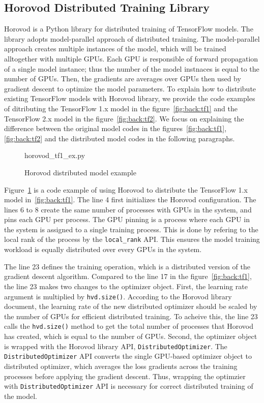 \subsection{Horovod Distributed Training Library}

Horovod is a Python library for distributed training of TensorFlow models.
The library adopts model-parallel approach of distributed training.
The model-parallel approach creates multiple instances of the model,
which will be trained alltogether with multiple GPUs.
Each GPU is responsible of forward propagation of a single model instance;
thus the number of the model instnaces is equal to the number of GPUs.
Then, the gradients are averages over GPUs then used by gradient descent
to optimize the model parameters. 
To explain how to distribute existing TensorFlow models with Horovod library,
we provide the code examples of ditributing 
the TensorFlow 1.x model in the figure~\ref{fig:back:tf1} and the TensorFlow
2.x model in the figure~\ref{fig:back:tf2}.
We focus on explaining the difference between the original model codes in
the figures~\ref{fig:back:tf1}, \ref{fig:back:tf2} and the distributed 
model codes in the following paragraphs.

\begin{figure}[ht!]
 
{horovod_tf1_ex.py}
  \caption{Horovod distributed model example}
\label{fig:back:hvd1} 
\end{figure}

Figure~\ref{fig:back:hvd1} is a code example of using Horovod to distribute
the TensorFlow 1.x model in~\ref{fig:back:tf1}.
The line 4 first initializes the Horovod configuration.
The lines 6 to 8 create the same number of processes with GPUs in the system,
and pins each GPU per process. 
The GPU pinning is a process where each GPU in the system is assigned to a 
single training process.
This is done by refering to the local rank of the process 
by the {\tt local\_rank} API.
This ensures the model training workload is equally distributed over
every GPUs in the system.

The line 23 defines the training operation, 
which is a distributed version of the gradient descent algorithm.
Compared to the line 17 in the figure~\ref{fig:back:tf1},
the line 23 makes two changes to the optimizer object.
First, the learning rate argument is multiplied by {\tt hvd.size()}.
According to the Horovod library document,
the learning rate of the new distributed optimizer 
should be scaled by the number of GPUs for efficient distributed training.
To acheive this, the line 23 calls the {\tt hvd.size()} method to
get the total number of processes that Horovod has created,
which is equal to the number of GPUs.
Second, the optimizer object is wrapped with the Horovod library API,
{\tt DistributedOptimizer}.
The {\tt DistributedOptimizer} API converts the single GPU-based optimizer 
object to distributed optimizer, which averages the loss gradients across the
training processes before applying the gradient descent.
Thus, wrapping the optimzier with {\tt DistributedOptimizer} API is necessary
for correct distributed training of the model.

